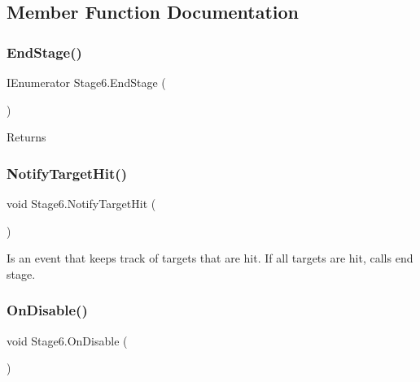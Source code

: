 \subsection{Member Function Documentation}
\mbox{\label{class_stage6_a1b5fa30c896fa0572746a20b6b3ebf71}} 
\subsubsection{\texorpdfstring{End\+Stage()}{EndStage()}}
{\footnotesize\ttfamily I\+Enumerator Stage6.\+End\+Stage (\begin{DoxyParamCaption}{ }\end{DoxyParamCaption})\hspace{0.3cm}{\ttfamily [private]}}





\begin{DoxyReturn}{Returns}

\end{DoxyReturn}
\mbox{\label{class_stage6_a4c5fdae8e6d256d005e1ce12e313274c}} 
\subsubsection{\texorpdfstring{Notify\+Target\+Hit()}{NotifyTargetHit()}}
{\footnotesize\ttfamily void Stage6.\+Notify\+Target\+Hit (\begin{DoxyParamCaption}{ }\end{DoxyParamCaption})}



Is an event that keeps track of targets that are hit. If all targets are hit, calls end stage. 

\mbox{\label{class_stage6_a2482ff2ad4b567c6c7308e7623ed2edd}} 
\subsubsection{\texorpdfstring{On\+Disable()}{OnDisable()}}
{\footnotesize\ttfamily void Stage6.\+On\+Disable (\begin{DoxyParamCaption}{ }\end{DoxyParamCaption})\hspace{0.3cm}{\ttfamily [private]}}

